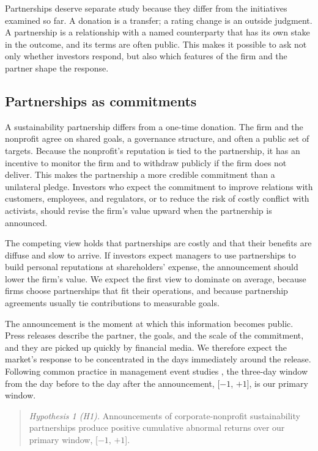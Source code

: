 \documentclass[11pt]{article}
\newcommand{\win}[2]{[$#1$, $#2$]}
\begin{document}
Partnerships deserve separate study because they differ from the initiatives examined so far. A donation is a transfer; a rating change is an outside judgment. A partnership is a relationship with a named counterparty that has its own stake in the outcome, and its terms are often public. This makes it possible to ask not only whether investors respond, but also which features of the firm and the partner shape the response.

\subsection{Partnerships as commitments}

A sustainability partnership differs from a one-time donation. The firm and the nonprofit agree on shared goals, a governance structure, and often a public set of targets. Because the nonprofit's reputation is tied to the partnership, it has an incentive to monitor the firm and to withdraw publicly if the firm does not deliver. This makes the partnership a more credible commitment than a unilateral pledge. Investors who expect the commitment to improve relations with customers, employees, and regulators, or to reduce the risk of costly conflict with activists, should revise the firm's value upward when the partnership is announced.

The competing view holds that partnerships are costly and that their benefits are diffuse and slow to arrive. If investors expect managers to use partnerships to build personal reputations at shareholders' expense, the announcement should lower the firm's value. We expect the first view to dominate on average, because firms choose partnerships that fit their operations, and because partnership agreements usually tie contributions to measurable goals.

The announcement is the moment at which this information becomes public. Press releases describe the partner, the goals, and the scale of the commitment, and they are picked up quickly by financial media. We therefore expect the market's response to be concentrated in the days immediately around the release. Following common practice in management event studies \citep{mcwilliams1997}, the three-day window from the day before to the day after the announcement, \win{-1}{+1}, is our primary window.

\begin{quote}
\textit{Hypothesis 1 (H1).} Announcements of corporate-nonprofit sustainability partnerships produce positive cumulative abnormal returns over our primary window, \win{-1}{+1}.
\end{quote}
\end{document}
